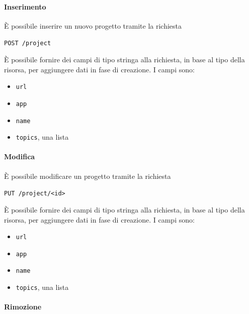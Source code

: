 
\paragraph{Inserimento}
È possibile inserire un nuovo progetto tramite la richiesta
    \begin{center}
        \texttt{POST /project}
    \end{center}

È possibile fornire dei campi di tipo stringa alla richiesta, in base al tipo della risorsa, per aggiungere dati in fase di creazione.
I campi sono:
\begin{itemize}[noitemsep]
    \item \texttt{url}
    \item \texttt{app}
    \item \texttt{name}
    \item \texttt{topics}, una lista
\end{itemize}


\paragraph{Modifica}

È possibile modificare un progetto tramite la richiesta
\begin{center}
    \texttt{PUT /project/<id>}
\end{center}


È possibile fornire dei campi di tipo stringa alla richiesta, in base al tipo della risorsa, per aggiungere dati in fase di creazione.
I campi sono:
\begin{itemize}[noitemsep]
    \item \texttt{url}
    \item \texttt{app}
    \item \texttt{name}
    \item \texttt{topics}, una lista
\end{itemize}


\paragraph{Rimozione}

